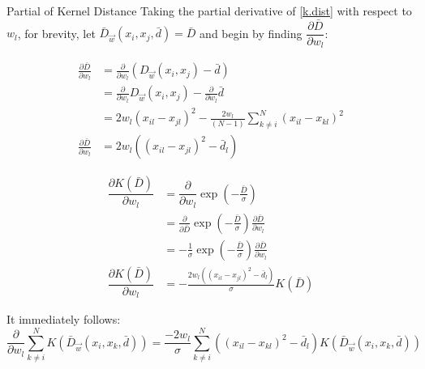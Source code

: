 \documentclass[12pt, a4paper]{article}
\begin{document}
\begin{section}{Partial of Kernel Distance} \label{sec:2}
    Taking the partial derivative of \ref{k.dist} with respect to $w_l$, for
    brevity, let  $\bar D_{\vec w}(x_i, x_j, \bar d) = \bar D$ and begin by
    finding $\dfrac{\partial \bar D}{\partial w_l}$:

    \begin{align*}
        \frac{\partial \bar D}{\partial w_l} &= \frac{\partial}{\partial w_l}
            \left (D_{\vec w}(x_i, x_j) - \bar d \right) \\
            &= \frac{\partial}{\partial w_l} D_{\vec w}(x_i, x_j)
             - \frac{\partial}{\partial w_l} \bar d \\
            &= 2w_l(x_{il} - x_{jl})^2 - \frac{2w_l}{(N - 1)}
               \sum \limits_{k \neq i}^N (x_{il} - x_{kl})^2 \\
        \frac{\partial \bar D}{\partial w_l} &= 
            2w_l\left ( (x_{il} - x_{jl})^2 - \bar d_l \right )
    \end{align*}

    \begin{align*}
        \dfrac{\partial K(\bar D)}{\partial w_l} &= 
                \dfrac{\partial }{\partial w_l}
                \exp{\left ( - \frac{\bar D}{\sigma} \right )} \\
        &= \frac{\partial}{\partial \bar D} 
                \exp{ \left ( -  \frac{\bar D}{\sigma} \right )}
                \frac{\partial \bar D}{\partial w_l} \\
        &= - \frac{1}{\sigma} \exp{ \left ( -  \frac{\bar D}{\sigma} \right )}
             \frac{\partial \bar D}{\partial w_l} \\
        \dfrac{\partial K (\bar D) }{\partial w_l}
            &= - \frac{ 2w_l\left ( (x_{il} - x_{jl})^2 - \bar d_l \right )}{\sigma}
               K(\bar D)
    \end{align*}

    It immediately follows:
    \[
      \frac{\partial}{\partial w_l} \sum \limits_{k \neq i}^N
      K (\bar D_{\vec w}(x_i, x_k, \bar d) )
      =
      \frac{-2 w_l}{\sigma} \sum \limits_{k \neq i}^N
        \left ( (x_{il} - x_{kl})^2 - \bar d_l \right )
        K (\bar D_{\vec w}(x_i, x_k, \bar d) ) 
    \]
\end{section}
\end{document}
